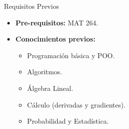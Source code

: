 \documentclass[10pt]{beamer}
\begin{document}
\begin{frame}{Requisitos Previos}
    \begin{itemize}
        \item \textbf{Pre-requisitos:} MAT 264.
        \item \textbf{Conocimientos previos:}
            \begin{itemize}
                \item Programación básica y POO.
                \item Algoritmos.
                \item Álgebra Lineal.
                \item Cálculo (derivadas y gradientes).
                \item Probabilidad y Estadística.
            \end{itemize}
    \end{itemize}
\end{frame}
\end{document}

